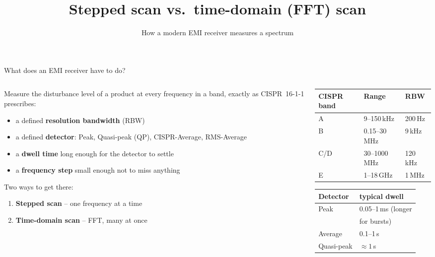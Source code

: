\documentclass[aspectratio=169]{beamer}
\title{Stepped scan vs.\ time-domain (FFT) scan}
\subtitle{How a modern EMI receiver measures a spectrum}
\date{}
\begin{document}
\begin{frame}
  \titlepage
\end{frame}

\begin{frame}{What does an EMI receiver have to do?}

\begin{columns}[T]
\begin{column}{0.55\textwidth}
  \small
  Measure the disturbance level of a product at \alert{every frequency}
  in a band, exactly as CISPR~16-1-1 prescribes:

  \smallskip
  \begin{itemize}
    \item a defined \textbf{resolution bandwidth} (RBW)
    \item a defined \textbf{detector}: Peak, Quasi-peak (QP),
          CISPR-Average, RMS-Average
    \item a \textbf{dwell time} long enough for the detector to settle
    \item a \textbf{frequency step} small enough not to miss anything
  \end{itemize}

  \smallskip
  Two ways to get there:
  \begin{enumerate}
    \item \textcolor{stepc}{\textbf{Stepped scan}} -- one frequency at a time
    \item \textcolor{fftc}{\textbf{Time-domain scan}} -- FFT, many at once
  \end{enumerate}
\end{column}
\begin{column}{0.42\textwidth}
  \footnotesize
  \centering
  \begin{tabular}{@{}lll@{}}
    \toprule
    CISPR band & Range & RBW \\
    \midrule
    A & 9--150\,kHz     & 200\,Hz \\
    B & 0.15--30\,MHz   & 9\,kHz \\
    C/D & 30--1000\,MHz & 120\,kHz \\
    E & 1--18\,GHz      & 1\,MHz \\
    \bottomrule
  \end{tabular}

  \bigskip
  \begin{tabular}{@{}ll@{}}
    \toprule
    Detector & typical dwell \\
    \midrule
    Peak       & 0.05--1\,ms (longer \\
               & \quad for bursts) \\
    Average    & 0.1--1\,s \\
    Quasi-peak & $\approx 1$\,s \\
    \bottomrule
  \end{tabular}
\end{column}
\end{columns}

\end{frame}
\end{document}
